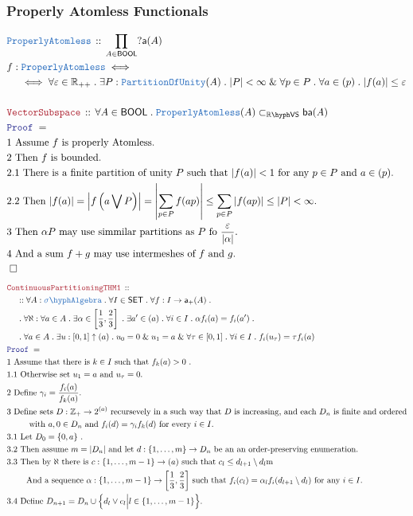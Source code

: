 \documentclass[12pt]{scrartcl}
\newcommand{\TYPE}[1]{\textcolor{NavyBlue}{\mathtt{#1}}}
\newcommand{\LOGIC}[1]{\textcolor{Blue}{\mathtt{#1}}}
\newcommand{\THM}[1]{\textcolor{Maroon}{\mathtt{#1}}}
\renewcommand{\.}{\; . \;}
\newcommand{\Theorem}[2]{& \THM{#1} \, :: \, #2 \\ & \Proof = \\ }
\newcommand{\DeclareType}[2]{& \TYPE{#1} \, :: \, #2 \\}
\newcommand{\DefineType}[3]{& #1 : \TYPE{#2} \iff #3 \\}
\newcommand{\NewLine}{\\ & \kern 1pc}
\newcommand{\Page}[1]{ \begin{align*} #1 \end{align*}   }
\renewcommand{\And}{\; \& \;}
\newcommand{\Int}{\mathbb{Z} }
\newcommand{\Reals}{\mathbb{R} }
\newcommand{\QED}{\; \square}
\newcommand{\EndProof}{& \QED \\}
\newcommand{\Proof}{\LOGIC{Proof} \; }
\newcommand{\Explain}[1]{& \text{#1.} \\}
\newcommand{\ExplainFurther}[1]{& \text{#1} \\}
\newcommand{\SA}{\TYPE{\sigma \hyph Algebra}}
\newcommand{\SET}{\mathsf{SET}}
\newcommand{\PoU}{\TYPE{PartitionOfUnity}}
\newcommand{\BOOL}{\mathsf{BOOL}}
\newcommand{\subvec}[1]{\subset_{\VS{#1}}}%
\newcommand{\VS}[1]{#1\hyph\mathsf{VS}} %
\newcommand{\af}{\mathsf{a}}
\newcommand{\baf}{\mathsf{ba}}
\newcommand{\PAless}{\TYPE{ProperlyAtomless}}
\begin{document}
\subsubsection{Properly Atomless Functionals}
\Page{
	\DeclareType{\PAless}{\prod_{A \in \BOOL} ?\af(A)}
	\DefineType{f}{\PAless}{ \NewLine
		\iff 
		\forall \varepsilon \in \Reals_{++} \.
		\exists P : \PoU(A) \. 
		|P| < \infty \And 
		\forall p \in P \. 
		\forall a \in (p) \.
		|f(a)| \le \varepsilon  
	}
	\\
	\Theorem{VectorSubspace}
	{
		\forall A \in \BOOL \.
		\PAless(A) \subvec{\Reals} \baf(A)
	}
	\Explain{1 Assume $f$ is properly Atomless}
	\Explain{2 Then $f$ is bounded}
	\Explain{2.1 There is a finite partition of unity $P$ such that 
		$|f(a)| < 1$ for any $p \in P$ and $a \in (p)$}
	\Explain{2.2 Then 
		$|f(a)| = \left|f\left(a \bigvee P \right)\right| 
			=\left| \sum_{p \in P} f(ap) \right| \le \sum_{p \in P} |f(ap)| \le |P| < \infty		
		$}
	\Explain{3 Then $\alpha P$ may use simmilar partitions as $P$ fo $\frac{\varepsilon}{|\alpha|}$}
	\Explain{4 And a sum $f + g$ may use intermeshes of $f$ and $g$}
	\EndProof
}\Page{
	\Theorem{ContinuousPartitioningTHM1}
	{
		\NewLine ::
		\forall A : \SA \.
		\forall I \in \SET \.
		\forall f : I \to \af_+(A) \. \NewLine \.
		\forall \aleph : \forall a \in A \. 
		\exists \alpha \in \left[ \frac{1}{3},\frac{2}{3} \right] \.
		\exists a' \in (a) \.
		\forall i \in I \.
		\alpha f_i(a) = f_i(a') \. \NewLine \.
		\forall a \in A \. 
		\exists  u : [0,1] \uparrow (a) \.
		u_0 = 0 \And u_1 = a \And 
		\forall \tau \in [0,1] \.
		\forall i \in I \.
		f_i(u_\tau) =  \tau f_i(a) 
	}
	\Explain{1 Assume that there is $k \in I$ such that $f_k(a) > 0$ }
	\Explain{1.1 Otherwise set $u_1 = a$ and $u_\tau = 0$}
	\Explain{2 Define $\gamma_i = \frac{f_i(a)}{f_k(a)}$}
	\ExplainFurther{3 Define sets $D : \Int_+ \to 2^{(a)}$ recursevely in a such way that 
	   $D$ is increasing, and each $D_n$ is finite and ordered}
	\Explain{ $\quad \quad$ with $a,0 \in D_n$ and $f_i(d) = \gamma_i f_k(d)$ for every $i \in I$}
	\Explain{3.1 Let $D_0 = \{0,a\}$  }
	\Explain{3.2  Then assume $m = |D_n|$ and let $d : \{1,\ldots,m\} \to D_n$ be an   
		an order-preserving enumeration}
	\ExplainFurther{3.3 Then by $\aleph$ there is 
		$c : \{1,\ldots,m-1\} \to (a)$ such that $c_l \le d_{l+1} \setminus d_l$m}
	\Explain{$\quad \quad$ And  a sequence 
		$\alpha : \{1,\ldots,m-1\} \to \left[\frac{1}{3},\frac{2}{3}\right]$
		such that $f_i(c_l) = \alpha_l f_i(d_{l+1}\setminus d_l)$ for any $i \in I$}
	\Explain{3.4 Define $D_{n+1} = D_n \cup \Big\{ d_l \vee c_l \Big| l \in \{1,\ldots,m-1\}   \Big\}$}
}
\end{document}
